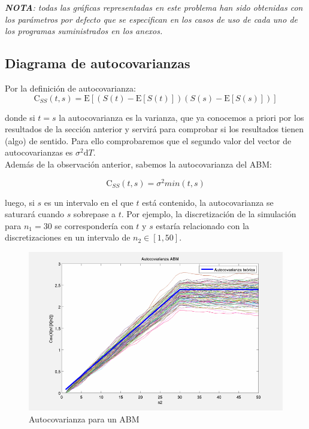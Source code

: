 \documentclass[a4paper,11pt]{article}
\begin{document}
\textit{\textbf{NOTA}: todas las gr\'aficas representadas en este problema han
sido obtenidas con los par\'ametros por defecto que se especifican en los casos
de uso de cada uno de los programas suministrados en los anexos.}

\subsection{Diagrama de autocovarianzas}

Por la definici\'on de autocovarianza:\\

\begin{equation*}
   \mathrm{C}_{SS}(t,s) = \mathrm{E}[(S(t)-\mathrm{E}[S(t)])(S(s)-\mathrm{E}[S(s)])]
\end{equation*}

donde si $t = s$ la autocovarianza es la varianza, que ya conocemos a priori por los
resultados de la secci\'on anterior y servir\'a para comprobar si los resultados
tienen (algo) de sentido. Para ello comprobaremos que el segundo valor del
vector de autocovarianzas es $\sigma^2\mathrm{d}T$.\\

Adem\'as de la observaci\'on anterior, sabemos la autocovarianza del ABM:

\begin{equation*}
   \tag{Autocovarianza}
   \mathrm{C}_{SS}(t,s) = \sigma^2 min(t,s)
\end{equation*}

luego, si $s$ es un intervalo en el que $t$ est\'a contenido, la autocovarianza
se saturar\'a cuando $s$ sobrepase a $t$. Por ejemplo,
la discretizaci\'on de la simulaci\'on para $n_1=30$ se corresponder\'ia con $t$ y
$s$ estar\'ia relacionado con la discretizaciones en un intervalo de $n_2 \in [1,
50]$.

\begin{figure}[htb]
   \begin{center}
      \includegraphics[scale=0.5,
      keepaspectratio]{./figures/autocovABM.png}
   \end{center}
   \caption{Autocovarianza para un ABM}
\end{figure}
\end{document}
